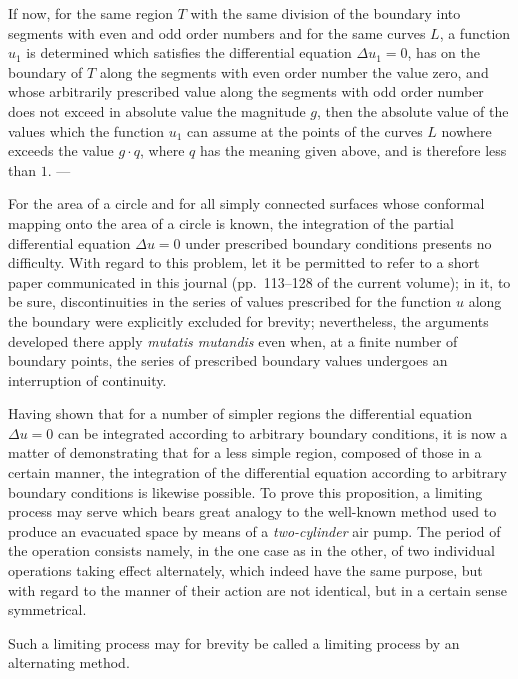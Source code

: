 \documentclass{article}
\begin{document}
If now, for the same region $T$ with the same division of the boundary into segments with even and odd order numbers and for the same curves $L$, a function $u_1$ is determined which satisfies the differential equation $\Delta u_1 = 0$, has on the boundary of $T$ along the segments with even order number the value zero, and whose arbitrarily prescribed value along the segments with odd order number does not exceed in absolute value the magnitude $g$, then the absolute value of the values which the function $u_1$ can assume at the points of the curves $L$ nowhere exceeds the value $g \cdot q$, where $q$ has the meaning given above, and is therefore less than $1$. ---


For the area of a circle and for all simply connected surfaces whose conformal mapping onto the area of a circle is known, the integration of the partial differential equation $\Delta u = 0$ under prescribed boundary conditions presents no difficulty. With regard to this problem, let it be permitted to refer to a short paper communicated in this journal (pp.~113--128 of the current volume); in it, to be sure, discontinuities in the series of values prescribed for the function $u$ along the boundary were explicitly excluded for brevity; nevertheless, the arguments developed there apply \emph{mutatis mutandis} even when, at a finite number of boundary points, the series of prescribed boundary values undergoes an interruption of continuity.

Having shown that for a number of simpler regions the differential equation $\Delta u = 0$ can be integrated according to arbitrary boundary conditions, it is now a matter of demonstrating that for a less simple region, composed of those in a certain manner, the integration of the differential equation according to arbitrary boundary conditions is likewise possible. To prove this proposition, a limiting process may serve which bears great analogy to the well-known method used to produce an evacuated space by means of a \emph{two-cylinder} air pump. The period of the operation consists namely, in the one case as in the other, of two individual operations taking effect alternately, which
indeed have the same purpose, but with regard to the manner of their action are not identical, but in a certain sense symmetrical.

Such a limiting process may for brevity be called a limiting process by an alternating method.

\end{document}
